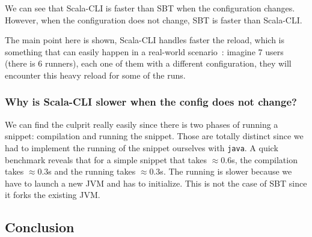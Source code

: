 \documentclass{article}
\begin{document}
\begin{table}[H]
    \centering
\end{table}

We can see that Scala-CLI is faster than SBT when the configuration changes. However, when the configuration does not change, SBT is faster than Scala-CLI.

The main point here is shown, Scala-CLI handles faster the reload, which is something that can easily happen in a real-world scenario~: imagine 7 users (there is 6 runners), each one of them with a different configuration, they will encounter this heavy reload for some of the runs.

\subsubsection{Why is Scala-CLI slower when the config does not change?}

We can find the culprit really easily since there is two phases of running a snippet: compilation and running the snippet. Those are totally distinct since we had to implement the running of the snippet ourselves with \lstinline{java}. A quick benchmark reveals that for a simple snippet that takes $\approx 0.6$s, the compilation takes $\approx 0.3$s and the running takes $\approx 0.3$s. The running is slower because we have to launch a new JVM and has to initialize. This is not the case of SBT since it forks the existing JVM.

\subsection{Conclusion}
\end{document}
